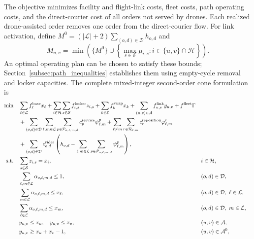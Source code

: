 \documentclass[final,3p,authoryear]{elsarticle}
\begin{document}
The objective minimizes facility and flight-link costs, fleet costs, path operating costs, and the direct-courier cost of all orders not served by drones.
Each realized drone-assisted order removes one order from the direct-courier flow.
For link activation, define $M^0=(|\mathcal L|+2)\sum_{(o,d)\in\mathcal D}h_{o,d}$ and
\begin{equation}
 M_{u,v}=\min\left(\{M^0\}\cup
 \left\{\max_{s\in\mathcal S}\mu_{i,s}:i\in\{u,v\}\cap\mathcal H\right\}\right).
 \label{eq:path_link_bound}
\end{equation}
An optimal operating plan can be chosen to satisfy these bounds; Section~\ref{subsec:path_inequalities} establishes them using empty-cycle removal and locker capacities.
The complete mixed-integer second-order cone formulation is
\begin{subequations}\label{eq:path_full}
\begin{align}
 \min\quad
 &\sum_{\ell\in\mathcal L}f_\ell^{\mathrm{base}}x_\ell
 +\sum_{i\in\mathcal H}\sum_{s\in\mathcal S}f_{i,s}^{\mathrm{locker}}z_{i,s}
 +\sum_{k\in\mathcal E}f_k^{\mathrm{swap}}x_k
 +\sum_{(u,v)\in\mathcal A}f_{u,v}^{\mathrm{link}}y_{u,v}
 +f^{\mathrm{fleet}}\Gamma\notag\\
 &+\sum_{(o,d)\in\mathcal D}\sum_{\ell,m\in\mathcal L}
   \sum_{p\in\mathcal P_{o,\ell,m,d}}c_p^{\mathrm{service}}\psi_{\ell,m}^{p}
 +\sum_{\ell\ne m}\sum_{r\in\mathcal R_{\ell,m}}
   c_r^{\mathrm{reposition}}\varphi_{\ell,m}^{r}\notag\\
 &+\sum_{(o,d)\in\mathcal D}c_{o,d}^{\mathrm{rider}}
  \left(h_{o,d}-\sum_{\ell,m\in\mathcal L}
  \sum_{p\in\mathcal P_{o,\ell,m,d}}\psi_{\ell,m}^{p}\right),
 \label{eq:path_objective}\\
 \text{s.t.}\quad
 &\sum_{s\in\mathcal S}z_{i,s}=x_i,
 &&i\in\mathcal H,\label{eq:path_install}\\
 &\sum_{\ell,m\in\mathcal L}\alpha_{o,\ell,m,d}\le1,
 &&(o,d)\in\mathcal D,\label{eq:path_assign}\\
 &\sum_{m\in\mathcal L}\alpha_{o,\ell,m,d}\le x_\ell,
 &&(o,d)\in\mathcal D,\ \ell\in\mathcal L,\label{eq:path_open_source}\\
 &\sum_{\ell\in\mathcal L}\alpha_{o,\ell,m,d}\le x_m,
 &&(o,d)\in\mathcal D,\ m\in\mathcal L,\label{eq:path_open_return}\\
 &y_{u,v}\le x_u,\quad y_{u,v}\le x_v,
 &&(u,v)\in\mathcal A,\label{eq:path_open_link}\\
 &y_{u,v}\ge x_u+x_v-1,
 &&(u,v)\in\mathcal A^0,\label{eq:path_colocation}\\

\end{align}
\end{subequations}
\end{document}
